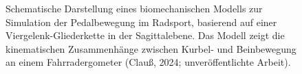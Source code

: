 \documentclass[
  letterpaper,
  DIV=11]{scrartcl}
\begin{document}
\begin{figure}


\caption{\label{fig-Viergelenk_Clauß_2}Schematische Darstellung eines
biomechanischen Modells zur Simulation der Pedalbewegung im Radsport,
basierend auf einer Viergelenk-Gliederkette in der Sagittalebene. Das
Modell zeigt die kinematischen Zusammenhänge zwischen Kurbel- und
Beinbewegung an einem Fahrradergometer (Clauß, 2024; unveröffentlichte
Arbeit).}

\end{figure}%
\end{document}
